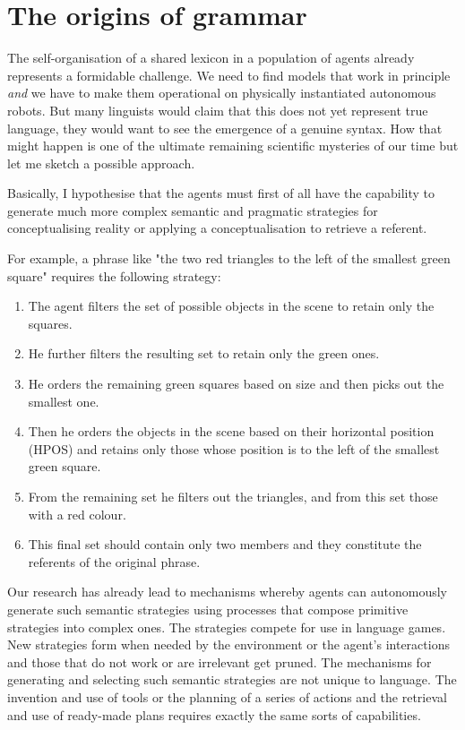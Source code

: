 \section{The origins of grammar}

The self-organisation of a shared lexicon in a population
of agents already represents a formidable challenge.
We need to find models that work in principle {\it and} 
we have to make them operational on physically 
instantiated autonomous robots. 
But many linguists would claim that this does not yet 
represent true language, they would want to see the 
emergence of a genuine syntax. How that might
happen is one of the ultimate remaining scientific
mysteries of our time but let me sketch a possible approach. 

Basically, I hypothesise that the agents must 
first of all have the capability to generate much 
more complex semantic and pragmatic strategies for conceptualising
reality or applying a conceptualisation to retrieve 
a referent.

For example, a phrase like "the two red
triangles to the left of the smallest green square" requires
the following strategy: 
\begin{enumerate}
\item The agent filters the set of possible objects in 
the scene to retain only the squares. 
\item He further filters the resulting set to retain only 
the green ones. 
\item He orders the remaining green squares based on 
size and then picks out the smallest one. 
\item Then he orders the objects in the scene based on 
their horizontal position (HPOS) and retains only those
whose position is to the left of the smallest green square. 
\item From the remaining set he filters out the triangles, 
and from this set those with a red colour. 
\item This final set should contain only two members
and they constitute the referents of the original phrase. 
\end{enumerate}
Our research has already lead to  
mechanisms whereby agents can autonomously generate such
semantic strategies using processes that compose
primitive strategies into complex ones. The
strategies compete for use in language games. 
New strategies form when needed by the environment or 
the agent's interactions and those that do not work or 
are irrelevant get pruned. The mechanisms for generating 
and selecting such semantic strategies are not unique
to language. The invention and use of tools or the 
planning of a series of actions and the retrieval 
and use of ready-made plans requires exactly the 
same sorts of capabilities. 

